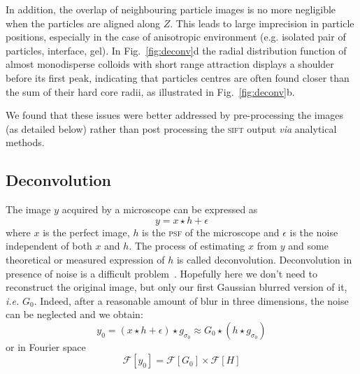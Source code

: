 \documentclass[8.5pt,twoside,twocolumn]{article}
\begin{document}
In addition, the overlap of neighbouring particle images is no more negligible when the particles are aligned along $Z$. This leads to large imprecision in particle positions, especially in the case of anisotropic environment (e.g. isolated pair of particles, interface, gel). In Fig.~\ref{fig:deconv}d the radial distribution function of almost monodisperse colloids with short range attraction displays a shoulder before its first peak, indicating that particles centres are often found closer than the sum of their hard core radii, as illustrated in Fig.~\ref{fig:deconv}b.

We found that these issues were better addressed by pre-processing the images (as detailed below) rather than post processing the \textsc{sift} output \emph{via} analytical methods.

\subsection*{Deconvolution}
The image $y$ acquired by a microscope can be expressed as 
\begin{equation}
y = x \star h + \epsilon
\end{equation}
where $x$ is the perfect image, $h$ is the \textsc{psf} of the microscope and $\epsilon$ is the noise independent of both $x$ and $h$. The process of estimating $x$ from $y$ and some theoretical or measured expression of $h$ is called deconvolution. Deconvolution in presence of noise is a difficult problem~\cite{Riad1986}. Hopefully here we don't need to reconstruct the original image, but only our first Gaussian blurred version of it, \emph{i.e.} $G_0$. Indeed, after a reasonable amount of blur in three dimensions, the noise can be neglected and we obtain:
\begin{equation}
y_0 = (x \star h + \epsilon) \star g_{\sigma_0} \approx G_0 \star (h \star g_{\sigma_0})
\end{equation}
or in Fourier space
\begin{equation}
\mathcal{F}[y_0] = \mathcal{F}[G_0] \times \mathcal{F}[H]
\label{eq:Fourier_conv}
\end{equation}
\end{document}

